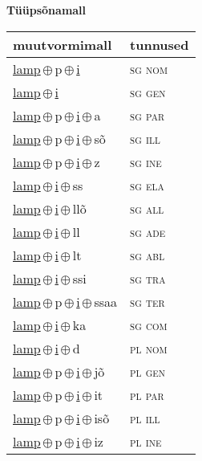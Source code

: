 

\vspace{3.5em}
\noindent \begin{minipage}{\textwidth}
\noindent \textbf{Tüüpsõnamall \,}\\

\begin{sideways}
\begin{tabular}{l l}
muutvormimall & tunnused \\
\hline
\underline{lamp}\,$\oplus$\,p\,$\oplus$\,\underline{i} & \textsc{ sg nom } \\
\underline{lamp}\,$\oplus$\,\underline{i} & \textsc{ sg gen } \\
\underline{lamp}\,$\oplus$\,p\,$\oplus$\,\underline{i}\,$\oplus$\,a & \textsc{ sg par } \\
\underline{lamp}\,$\oplus$\,p\,$\oplus$\,\underline{i}\,$\oplus$\,sõ & \textsc{ sg ill } \\
\underline{lamp}\,$\oplus$\,p\,$\oplus$\,\underline{i}\,$\oplus$\,z & \textsc{ sg ine } \\
\underline{lamp}\,$\oplus$\,\underline{i}\,$\oplus$\,ss & \textsc{ sg ela } \\
\underline{lamp}\,$\oplus$\,\underline{i}\,$\oplus$\,llõ & \textsc{ sg all } \\
\underline{lamp}\,$\oplus$\,\underline{i}\,$\oplus$\,ll & \textsc{ sg ade } \\
\underline{lamp}\,$\oplus$\,\underline{i}\,$\oplus$\,lt & \textsc{ sg abl } \\
\underline{lamp}\,$\oplus$\,\underline{i}\,$\oplus$\,ssi & \textsc{ sg tra } \\
\underline{lamp}\,$\oplus$\,p\,$\oplus$\,\underline{i}\,$\oplus$\,ssaa & \textsc{ sg ter } \\
\underline{lamp}\,$\oplus$\,\underline{i}\,$\oplus$\,ka & \textsc{ sg com } \\
\underline{lamp}\,$\oplus$\,\underline{i}\,$\oplus$\,d & \textsc{ pl nom } \\
\underline{lamp}\,$\oplus$\,p\,$\oplus$\,\underline{i}\,$\oplus$\,jõ & \textsc{ pl gen } \\
\underline{lamp}\,$\oplus$\,p\,$\oplus$\,\underline{i}\,$\oplus$\,it & \textsc{ pl par } \\
\underline{lamp}\,$\oplus$\,p\,$\oplus$\,\underline{i}\,$\oplus$\,isõ & \textsc{ pl ill } \\
\underline{lamp}\,$\oplus$\,p\,$\oplus$\,\underline{i}\,$\oplus$\,iz & \textsc{ pl ine } \\

\end{tabular}
\end{sideways}
\end{minipage}
